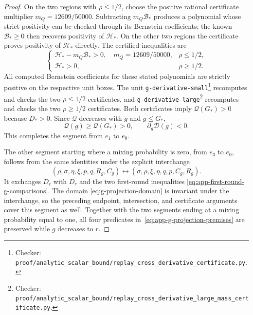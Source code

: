 \documentclass[11pt]{article}
\theoremstyle{remark}
\theoremstyle{plain}
\begin{document}
\begin{proof}
On the two regions with $\rho\le1/2$, choose the positive rational
certificate multiplier $m_Q=12609/50000$. Subtracting
$m_Q\mathcal B_*$ produces a polynomial whose strict positivity
can be checked through its Bernstein coefficients; the known
$\mathcal B_*\ge0$ then recovers positivity of $\mathcal H_*$.
On the other two regions the certificate proves positivity
of $\mathcal H_*$ directly. The certified inequalities are
\begin{equation}
 \begin{cases}
 \mathcal H_*-m_Q\mathcal B_*>0,\quad m_Q=12609/50000,
                         &\rho\le1/2,\\
 \mathcal H_*>0,          &\rho\ge1/2.
 \end{cases}
 \label{eq:app-g-numerator-sign-certificates}
\end{equation}
All computed Bernstein coefficients for these stated
polynomials are strictly positive on the respective unit boxes.
The unit \nolinkurl{g-derivative-small}\footnote{Checker:
\nolinkurl{proof/analytic_scalar_bound/replay_cross_derivative_certificate.py}.\label{fn:checker-g-derivative-small}} recomputes and checks the two
$\rho\le1/2$ certificates, and \nolinkurl{g-derivative-large}\footnote{Checker:
\nolinkurl{proof/analytic_scalar_bound/replay_cross_derivative_large_mass_certificate.py}.\label{fn:checker-g-derivative-large}}
recomputes and checks the two $\rho\ge1/2$ certificates.
Both certificates imply $\mathcal Q(G_*)>0$ because $D_*>0$.
Since $\mathcal Q$ decreases with $g$ and $g\le G_*$,
\begin{equation}
 \mathcal Q(g)\ge\mathcal Q(G_*)>0,\qquad
 \partial_g\mathcal D(g)<0.
 \label{eq:app-g-determinant-sign}
\end{equation}
This completes the segment from $e_1$ to $e_0$.

The other segment starting where a mixing probability is zero, from
$e_3$ to $e_0$, follows
from the same identities under the explicit interchange
\begin{equation}
 (\rho,\sigma,\eta,\xi,p,q,R_g,C_g)
       \longleftrightarrow
 (\sigma,\rho,\xi,\eta,q,p,C_g,R_g).
 \label{eq:app-player-interchange}
\end{equation}
It exchanges $D_c$ with $D_r$ and the two first-round inequalities
\eqref{eq:app-first-round-g-comparisons}. The domain
\eqref{eq:g-projection-domain} is invariant under the interchange,
so the preceding endpoint, intersection, and certificate arguments
cover this segment as well. Together with the two segments ending
at a mixing probability equal to one, all four predicates in~\eqref{eq:app-g-projection-premises}
are preserved while $g$ decreases to $r$.
\end{proof}
\end{document}
